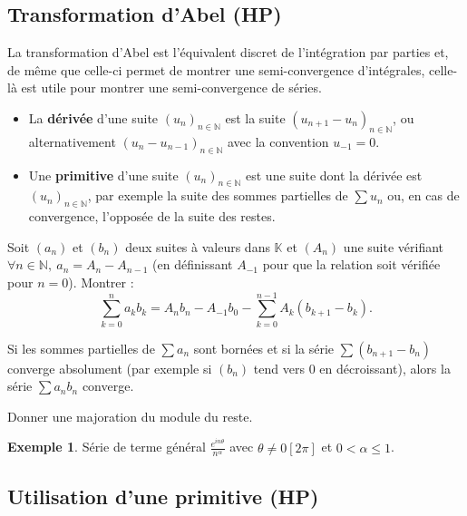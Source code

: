 \documentclass[french]{article}
\newcommand{\N}{\mathbb{N}}
\newcommand{\K}{\mathbb{K}}
\theoremstyle{plain}
\theoremstyle{definition}
\newtheorem*{ex}{Exemple}
\theoremstyle{remark}
\begin{document}
\subsection{Transformation d'Abel (HP)}

La transformation d'Abel est l'équivalent discret de l'intégration par parties et, de même que celle-ci permet de montrer une semi-convergence d'intégrales, celle-là est utile pour montrer une semi-convergence de séries.

\begin{itemize}
	\item La \textbf{dérivée} d'une suite $(u_n)_{n\in\N}$ est la suite $(u_{n+1}-u_n)_{n\in\N}$, ou alternativement $(u_{n}-u_{n-1})_{n\in\N}$ avec la convention $u_{-1}=0$.
	\item Une \textbf{primitive} d'une suite $(u_n)_{n\in\N}$ est une suite dont la dérivée est $(u_n)_{n\in\N}$, par exemple la suite des sommes partielles de $\displaystyle\sum u_n$ ou, en cas de convergence, l'opposée de la suite des restes.
\end{itemize}

\begin{exo}
	Soit $(a_n)$ et $(b_n)$ deux suites à valeurs dans $\K$ et $(A_n)$ une suite vérifiant $\forall n\in\N,\ a_{n}=A_n-A_{n-1}$ (en définissant $A_{-1}$ pour que la relation soit vérifiée pour $n=0$). Montrer : $$\sum_{k=0}^{n}a_kb_k=A_nb_n-A_{-1}b_0-\sum_{k=0}^{n-1}A_k(b_{k+1}-b_{k}).$$
\end{exo}

\begin{prop}
	Si les sommes partielles de $\displaystyle\sum a_n$ sont bornées et si la série $\displaystyle\sum (b_{n+1}-b_n)$ converge absolument (par exemple si $(b_n)$ tend vers $0$ en décroissant), alors la série $\displaystyle\sum a_nb_n$ converge.
\end{prop}

\begin{exo}
	Donner une majoration du module du reste.
\end{exo}

\begin{ex}
	Série de terme général $\displaystyle\frac{e^{in\theta}}{n^\alpha}$ avec $\theta\ne 0[2\pi]$ et $0<\alpha\leqslant 1$.
\end{ex}

\subsection{Utilisation d'une primitive (HP)}
\end{document}

